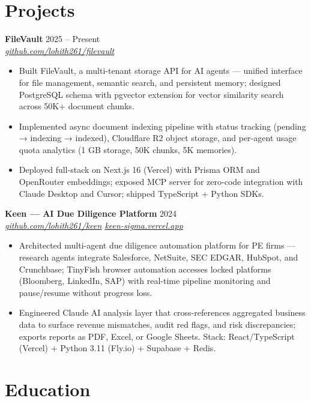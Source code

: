 \documentclass[10pt,letterpaper]{article}
\newcommand{\entry}[3]{%
  \vspace{3pt}\textbf{#1} \hfill #3 \\
  \textit{\small #2}\vspace{1pt}}
\begin{document}
\section{Projects}

\entry{FileVault}{\href{https://github.com/lohith261/filevault}{github.com/lohith261/filevault}}{2025 -- Present}
\begin{itemize}
  \item Built FileVault, a multi-tenant storage API for AI agents --- unified interface for file management, semantic search, and persistent memory; designed PostgreSQL schema with pgvector extension for vector similarity search across 50K+ document chunks.
  \item Implemented async document indexing pipeline with status tracking (pending → indexing → indexed), Cloudflare R2 object storage, and per-agent usage quota analytics (1 GB storage, 50K chunks, 5K memories).
  \item Deployed full-stack on Next.js 16 (Vercel) with Prisma ORM and OpenRouter embeddings; exposed MCP server for zero-code integration with Claude Desktop and Cursor; shipped TypeScript + Python SDKs.
\end{itemize}

\entry{Keen --- AI Due Diligence Platform}{\href{https://github.com/lohith261/keen}{github.com/lohith261/keen} \quad\textbullet\quad \href{https://keen-sigma.vercel.app/}{keen-sigma.vercel.app}}{2024}
\begin{itemize}
  \item Architected multi-agent due diligence automation platform for PE firms --- research agents integrate Salesforce, NetSuite, SEC EDGAR, HubSpot, and Crunchbase; TinyFish browser automation accesses locked platforms (Bloomberg, LinkedIn, SAP) with real-time pipeline monitoring and pause/resume without progress loss.
  \item Engineered Claude AI analysis layer that cross-references aggregated business data to surface revenue mismatches, audit red flags, and risk discrepancies; exports reports as PDF, Excel, or Google Sheets. Stack: React/TypeScript (Vercel) + Python 3.11 (Fly.io) + Supabase + Redis.
\end{itemize}

\section{Education}
\end{document}
